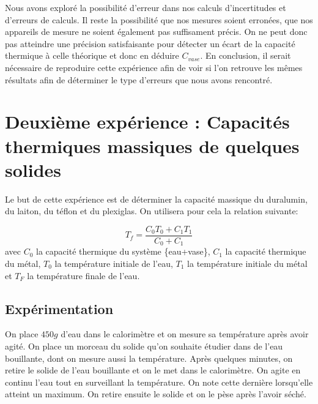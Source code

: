 \documentclass[12pt]{article}
\begin{document}
Nous avons exploré la possibilité d'erreur dans nos calculs d'incertitudes et d'erreurs de calculs. Il reste la possibilité que nos mesures soient erronées, que nos appareils de mesure ne soient également pas suffisament précis.
On ne peut donc pas atteindre une précision satisfaisante pour détecter un écart de la capacité thermique à celle théorique et donc en déduire $C_{vase}$. En conclusion, il serait nécessaire de reproduire cette expérience afin de voir si l'on retrouve les mêmes résultats afin de déterminer le type d'erreurs que nous avons rencontré.

\newpage
\section{Deuxième expérience : Capacités thermiques massiques de quelques solides}

Le but de cette expérience est de déterminer la capacité massique du duralumin, du laiton, du téflon et du plexiglas. On utilisera pour cela la relation suivante:

\begin{equation}
	T_f=\frac{C_0T_0+C_1T_1}{C_0+C_1}
\label{EquationTf}
\end{equation}
avec $C_0$ la capacité thermique du système \{eau+vase\}, $C_1$ la capacité thermique du métal, $T_0$ la température initiale de l'eau, $T_1$ la température initiale du métal et $T_F$ la température finale de l'eau.

\subsection{Expérimentation}

On place $450g$ d'eau dans le calorimètre et on mesure sa température après avoir agité. On place un morceau du solide qu'on souhaite étudier dans de l'eau bouillante, dont on mesure aussi la température. 
Après quelques minutes, on retire le solide de l'eau bouillante et on le met dans le calorimètre. 
On agite en continu l'eau tout en surveillant la température. On note cette dernière lorsqu'elle atteint un maximum. 
On retire ensuite le solide et on le pèse après l'avoir séché.
\end{document}
